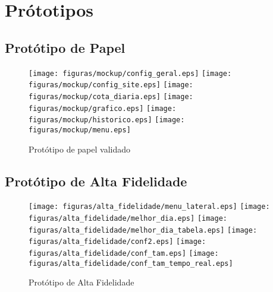 \chapter[Prótotipos]{Prótotipos}

\section[Protótipo de Papel]{Protótipo de Papel}

\begin{figure}[h]
	\centering
	\label{fig03}
		\texttt{[image: figuras/mockup/config\_geral.eps]}
		\texttt{[image: figuras/mockup/config\_site.eps]}
		\texttt{[image: figuras/mockup/cota\_diaria.eps]}
		\texttt{[image: figuras/mockup/grafico.eps]}
		\texttt{[image: figuras/mockup/historico.eps]}
		\texttt{[image: figuras/mockup/menu.eps]}
	\caption{Protótipo de papel validado}
\end{figure}

\section[Protótipo de Alta Fidelidade]{Protótipo de Alta Fidelidade}

\begin{figure}[h]
	\centering
	\label{fig03}
		\texttt{[image: figuras/alta\_fidelidade/menu\_lateral.eps]}
		\texttt{[image: figuras/alta\_fidelidade/melhor\_dia.eps]}
		\texttt{[image: figuras/alta\_fidelidade/melhor\_dia\_tabela.eps]}
		\texttt{[image: figuras/alta\_fidelidade/conf2.eps]}
		\texttt{[image: figuras/alta\_fidelidade/conf\_tam.eps]}
		\texttt{[image: figuras/alta\_fidelidade/conf\_tam\_tempo\_real.eps]}
	\caption{Protótipo de Alta Fidelidade}
\end{figure}